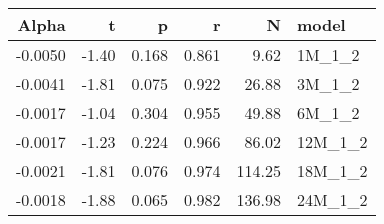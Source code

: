 \begin{table}[ht]
\centering
\begin{tabular}{rrrrrl}
  \hline
Alpha & t & p & r & N & model \\ 
  \hline
-0.0050 & -1.40 & 0.168 & 0.861 & 9.62 & 1M\_1\_2 \\ 
  -0.0041 & -1.81 & 0.075 & 0.922 & 26.88 & 3M\_1\_2 \\ 
  -0.0017 & -1.04 & 0.304 & 0.955 & 49.88 & 6M\_1\_2 \\ 
  -0.0017 & -1.23 & 0.224 & 0.966 & 86.02 & 12M\_1\_2 \\ 
  -0.0021 & -1.81 & 0.076 & 0.974 & 114.25 & 18M\_1\_2 \\ 
  -0.0018 & -1.88 & 0.065 & 0.982 & 136.98 & 24M\_1\_2 \\ 
   \hline
\end{tabular}
\end{table}

